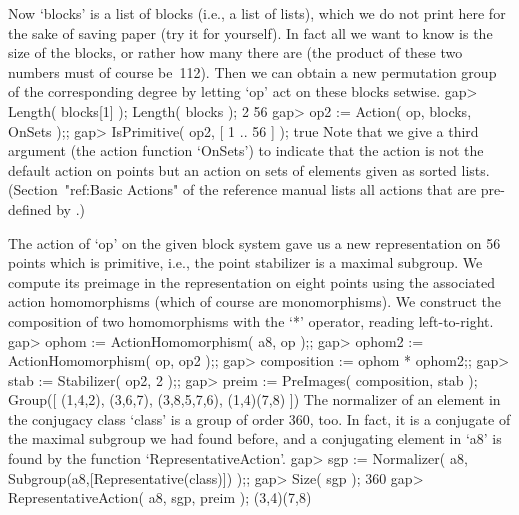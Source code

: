 Now `blocks' is a list of blocks (i.e., a list of lists), which we do not
print  here for the  sake of saving paper (try  it for yourself). In fact
all we want to know is the size of  the blocks, or  rather how many there
are (the product of these two numbers must of course be~112). Then we can
obtain a new  permutation group  of the  corresponding  degree by letting
`op' act on these blocks setwise.
\beginexample
gap> Length( blocks[1] );  Length( blocks );
2
56
gap> op2 := Action( op, blocks, OnSets );;
gap> IsPrimitive( op2, [ 1 .. 56 ] );
true
\endexample
Note that we give a third argument (the action function `OnSets') to
indicate that the action is not the default action on points but an
action on sets of elements given as sorted lists.
(Section~"ref:Basic Actions" of the reference manual lists all
actions that are pre-defined by {\GAP}.)

The action of `op' on the given block system gave us a new representation
on 56 points which is primitive, i.e., the  point stabilizer is a maximal
subgroup. We  compute its preimage in the  representation on eight points
using the   associated   action homomorphisms (which   of   course are
monomorphisms). We construct  the  composition of two  homomorphisms with
the `*' operator, reading left-to-right.
\beginexample
gap> ophom := ActionHomomorphism( a8, op );;
gap> ophom2 := ActionHomomorphism( op, op2 );;
gap> composition := ophom * ophom2;;
gap> stab := Stabilizer( op2, 2 );;
gap> preim := PreImages( composition, stab );
Group([ (1,4,2), (3,6,7), (3,8,5,7,6), (1,4)(7,8) ])
\endexample
The normalizer of an element in the conjugacy class `class' is a group of
order 360, too. In fact, it is a conjugate of the maximal subgroup we had
found before, and a conjugating element in `a8'  is found by the function
`RepresentativeAction'.
\beginexample
gap> sgp := Normalizer( a8, Subgroup(a8,[Representative(class)]) );;
gap> Size( sgp );
360
gap> RepresentativeAction( a8, sgp, preim );
(3,4)(7,8)
\endexample

